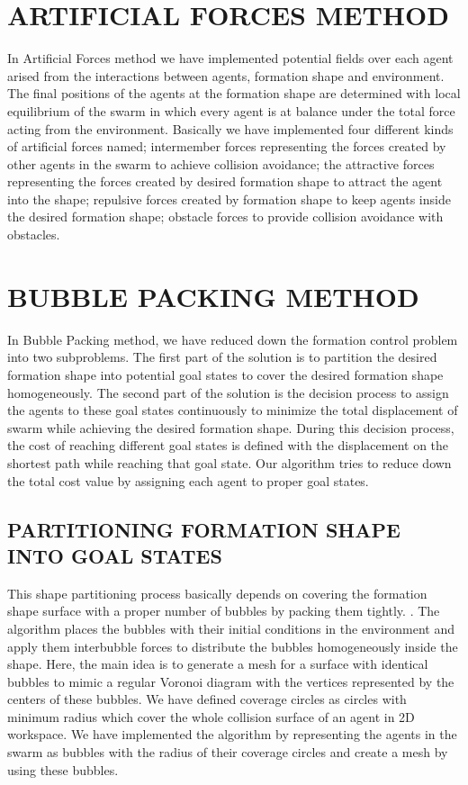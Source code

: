 \documentclass[letterpaper, 10 pt, conference]{ieeeconf}  %
\begin{document}
\section{ARTIFICIAL FORCES METHOD}
In Artificial Forces method we have implemented potential fields over each agent arised from the interactions between agents, formation shape and environment. The final positions of the agents at the formation shape  are determined with local equilibrium of the swarm in which every agent is at balance under the total force acting from the environment. Basically we have implemented four different kinds of artificial forces named; intermember forces representing the forces created by other agents in the swarm to achieve collision avoidance; the attractive forces representing the forces created by desired formation shape to attract the agent into the shape; repulsive forces created by formation shape to keep agents inside the desired formation shape; obstacle forces to provide collision avoidance with obstacles.

\section{BUBBLE PACKING METHOD}
In Bubble Packing method, we have reduced down the formation control problem into two subproblems. The first part of the solution is to partition the desired formation shape into potential goal states to cover the desired formation shape homogeneously. The second part of the solution is the decision process to assign the agents to these goal states continuously to minimize the total displacement of swarm while achieving the desired formation shape. During this decision process, the cost of reaching different goal states is defined with the displacement on the shortest path while reaching that goal state. Our algorithm tries to reduce down the total cost value by assigning each agent to proper goal states.
			
\subsection{PARTITIONING FORMATION SHAPE INTO GOAL STATES} \label{Partitioning_ref}		
This shape partitioning process basically depends on covering the formation shape surface with a proper number of bubbles by packing them tightly. \cite{27}.  The algorithm places the bubbles with their initial conditions in the environment and apply them interbubble forces to distribute the bubbles homogeneously inside the shape. Here, the main idea is to generate a mesh for a surface with identical bubbles to mimic a regular Voronoi diagram with the vertices represented by the centers of these bubbles. We have defined coverage circles as circles with minimum radius which cover the whole collision surface of an agent in 2D workspace. We have implemented the algorithm by representing the agents in the swarm as bubbles with the radius of their coverage circles and create a mesh by using these bubbles. 
			
\end{document}
